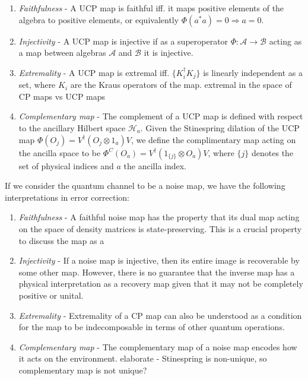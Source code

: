 \documentclass{article}
\newcommand{\mA}{\mathcal{A}}
\newcommand{\mB}{\mathcal{B}}
\theoremstyle{definition}
\begin{document}
\begin{enumerate}
    \item \textit{Faithfulness} - A UCP map is faithful iff. it maps positive elements of the algebra to positive elements, or equivalently $\Phi(a^*a) = 0 \Rightarrow a = 0$.
    \item \textit{Injectivity} - A UCP map is injective if as a superoperator $\Phi: \mA \to \mB$ acting as a map between algebras $\mA$ and $\mB$ it is injective.
    \item \textit{Extremality} - A UCP map is extremal iff. $\{K_i ^\dagger K_j \}$ is linearly independent as a set, where $K_i$ are the Kraus operators of the map. \color{brown} extremal in the space of CP maps vs UCP maps \color{black}
    \item \textit{Complementary map} - The complement of a UCP map is defined with respect to the ancillary Hilbert space $\mathcal{H}_a$.  Given the Stinespring dilation of the UCP map $\Phi(O_j) = V^\dagger(O_j\otimes 1_a)V$, we define the complimentary map acting on the ancilla space to be $\Phi^C(O_a) = V^\dagger(1_{\{j\}}\otimes O_a)V$, where $\{j\}$ denotes the set of physical indices and $a$ the ancilla index.
\end{enumerate}

If we consider the quantum channel to be a noise map, we have the following interpretations in error correction:

\begin{enumerate}
    \item \textit{Faithfulness} - A faithful noise map has the property that its dual map acting on the space of density matrices is state-preserving.  This is a crucial property to discuss the map as a 
    \item \textit{Injectivity} - If a noise map is injective, then its entire image is recoverable by some other map.  However, there is no guarantee that the inverse map has a physical interpretation as a recovery map given that it may not be completely positive or unital. 
    \item \textit{Extremality} - Extremality of a CP map can also be understood as a condition for the map to be indecomposable in terms of other quantum operations.  
    \item \textit{Complementary map} - The complementary map of a noise map encodes how it acts on the environment. \color{brown} elaborate - Stinespring is non-unique, so complementary map is not unique? \color{black}
\end{enumerate}
\end{document}
